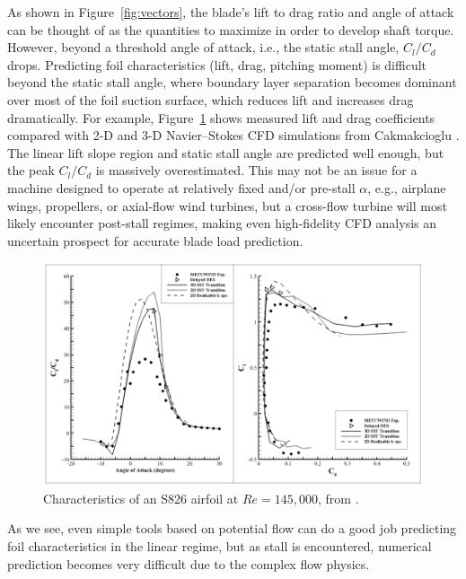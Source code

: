 As shown in Figure~\ref{fig:vectors}, the blade's lift to drag ratio and angle
of attack can be thought of as the quantities to maximize in order to develop
shaft torque. However, beyond a threshold angle of attack, i.e., the static
stall angle, $C_l/C_d$ drops. Predicting foil characteristics (lift, drag,
pitching moment) is difficult beyond the static stall angle, where boundary
layer separation becomes dominant over most of the foil suction surface, which
reduces lift and increases drag dramatically. For example,
Figure~\ref{fig:S826-perf} shows measured lift and drag coefficients compared
with 2-D and 3-D Navier--Stokes CFD simulations from Cakmakcioglu \etal
\cite{Cakmakcioglu2014}. The linear lift slope region and static stall angle are
predicted well enough, but the peak $C_l/C_d$ is massively overestimated. This
may not be an issue for a machine designed to operate at relatively fixed and/or
pre-stall $\alpha$, e.g., airplane wings, propellers, or axial-flow wind
turbines, but a cross-flow turbine will most likely encounter post-stall
regimes, making even high-fidelity CFD analysis an uncertain prospect for
accurate blade load prediction.


\begin{figure}[ht]
    \centering
    
    \includegraphics[width=\textwidth]{figures/cakmak-et-al-2014-fig8}
    
    \caption{Characteristics of an S826 airfoil at $Re=145,000$, from
        \cite{Cakmakcioglu2014}.}
    
    \label{fig:S826-perf}
\end{figure}


 As we see, even simple tools based on
potential flow can do a good job predicting foil characteristics in the linear
regime, but as stall is encountered, numerical prediction becomes very difficult
due to the complex flow physics.


